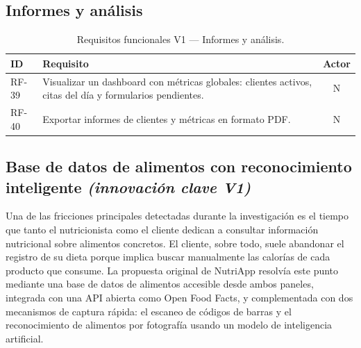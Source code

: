 \subsection{Informes y análisis}

\begin{table}[htbp]
\centering
\small
\begin{tabular}{|l|p{10.5cm}|c|}
\hline
\textbf{ID} & \textbf{Requisito} & \textbf{Actor} \\
\hline
RF-39 & Visualizar un dashboard con métricas globales: clientes activos, citas del día y formularios pendientes. & N \\
\hline
RF-40 & Exportar informes de clientes y métricas en formato PDF. & N \\
\hline
\end{tabular}
\caption{Requisitos funcionales V1 --- Informes y análisis.}
\label{tab:rf-informes-v1}
\end{table}

\subsection{Base de datos de alimentos con reconocimiento inteligente \textnormal{\textit{(innovación clave V1)}}}

Una de las fricciones principales detectadas durante la investigación es el tiempo que tanto el nutricionista como el cliente dedican a consultar información nutricional sobre alimentos concretos. El cliente, sobre todo, suele abandonar el registro de su dieta porque implica buscar manualmente las calorías de cada producto que consume. La propuesta original de NutriApp resolvía este punto mediante una base de datos de alimentos accesible desde ambos paneles, integrada con una API abierta como Open Food Facts, y complementada con dos mecanismos de captura rápida: el escaneo de códigos de barras y el reconocimiento de alimentos por fotografía usando un modelo de inteligencia artificial.

